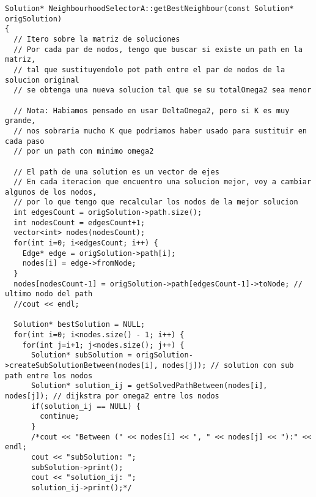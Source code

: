 \begin{lstlisting}[caption=NeighbourhoodSelectorA::getBestNeighbour()]
Solution* NeighbourhoodSelectorA::getBestNeighbour(const Solution* origSolution)
{ 
  // Itero sobre la matriz de soluciones
  // Por cada par de nodos, tengo que buscar si existe un path en la matriz, 
  // tal que sustituyendolo pot path entre el par de nodos de la solucion original 
  // se obtenga una nueva solucion tal que se su totalOmega2 sea menor
  
  // Nota: Habiamos pensado en usar DeltaOmega2, pero si K es muy grande,
  // nos sobraria mucho K que podriamos haber usado para sustituir en cada paso
  // por un path con minimo omega2                
  
  // El path de una solution es un vector de ejes   
  // En cada iteracion que encuentro una solucion mejor, voy a cambiar algunos de los nodos, 
  // por lo que tengo que recalcular los nodos de la mejor solucion             
  int edgesCount = origSolution->path.size();
  int nodesCount = edgesCount+1;
  vector<int> nodes(nodesCount); 
  for(int i=0; i<edgesCount; i++) {
    Edge* edge = origSolution->path[i];
    nodes[i] = edge->fromNode;
  }
  nodes[nodesCount-1] = origSolution->path[edgesCount-1]->toNode; // ultimo nodo del path
  //cout << endl;
      
  Solution* bestSolution = NULL;  
  for(int i=0; i<nodes.size() - 1; i++) {    
    for(int j=i+1; j<nodes.size(); j++) {           
      Solution* subSolution = origSolution->createSubSolutionBetween(nodes[i], nodes[j]); // solution con sub path entre los nodos            
      Solution* solution_ij = getSolvedPathBetween(nodes[i], nodes[j]); // dijkstra por omega2 entre los nodos
      if(solution_ij == NULL) {
        continue;
      }      
      /*cout << "Between (" << nodes[i] << ", " << nodes[j] << "):" << endl;
      cout << "subSolution: ";
      subSolution->print();
      cout << "solution_ij: ";
      solution_ij->print();*/
      

\end{lstlisting}
